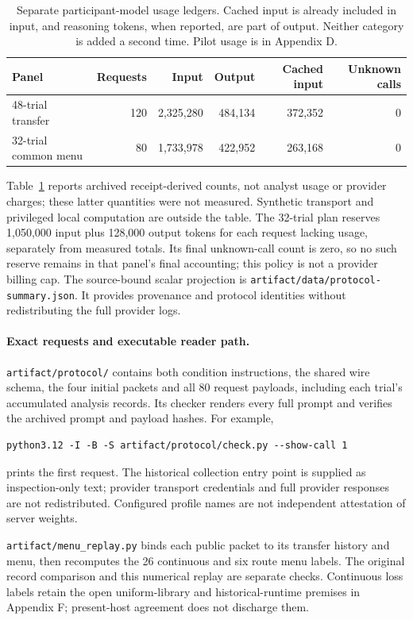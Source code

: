 \begin{table}[htbp]
\centering\small
\begin{tabular}{lrrrrr}\toprule
Panel & Requests & Input & Output & Cached input & Unknown calls\\\midrule
48-trial transfer & 120 & 2,325,280 & 484,134 & 372,352 & 0\\
32-trial common menu & 80 & 1,733,978 & 422,952 & 263,168 & 0\\\bottomrule
\end{tabular}
\caption{Separate participant-model usage ledgers. Cached input is already
included in input, and reasoning tokens, when reported, are part of output.
Neither category is added a second time. Pilot usage is in Appendix D.}
\label{tab:panel-usage}
\end{table}

Table~\ref{tab:panel-usage} reports archived receipt-derived counts, not
analyst usage or provider charges; these latter quantities were not
measured. Synthetic transport and privileged local computation are outside
the table. The 32-trial plan reserves 1,050,000 input plus 128,000 output
tokens for each request lacking usage, separately from measured totals.
Its final unknown-call count is zero, so no such reserve remains in that
panel's final accounting; this policy is not a provider billing cap.
The source-bound scalar projection is
\texttt{artifact/data/protocol-summary.json}. It provides provenance and
protocol identities without redistributing the full provider logs.


\paragraph{Exact requests and executable reader path.}
\texttt{artifact/protocol/} contains both condition instructions, the shared
wire schema, the four initial packets and all 80 request payloads, including
each trial's accumulated analysis records. Its checker renders every full
prompt and verifies the archived prompt and payload hashes. For example,
\begin{verbatim}
python3.12 -I -B -S artifact/protocol/check.py --show-call 1
\end{verbatim}
prints the first request. The historical collection entry point is supplied
as inspection-only text; provider transport credentials and full provider
responses are not redistributed. Configured profile names are not independent
attestation of server weights.

\texttt{artifact/menu\_replay.py} binds each public packet to its transfer
history and menu, then recomputes the 26 continuous and six route menu labels.
The original record comparison and this numerical replay are separate checks.
Continuous loss labels retain the open uniform-library and historical-runtime
premises in Appendix F; present-host agreement does not discharge them.

